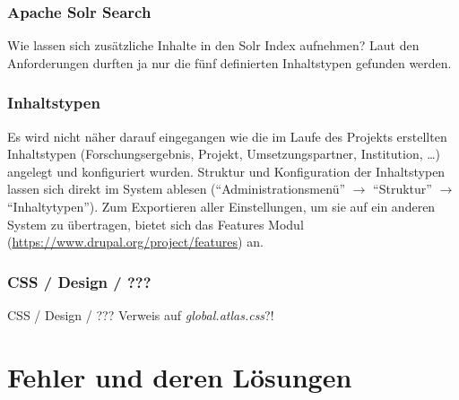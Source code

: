 \subsubsection{Apache Solr Search}\label{subsub:apachesolr}
Wie lassen sich zusätzliche Inhalte in den Solr Index aufnehmen? Laut den Anforderungen durften ja nur die fünf definierten Inhaltstypen gefunden werden. 

\subsubsection{Inhaltstypen}\label{subsub:inhaltstypen}
Es wird nicht näher darauf eingegangen wie die im Laufe des Projekts erstellten Inhaltstypen (Forschungsergebnis, Projekt, Umsetzungspartner, Institution, \dots) angelegt und konfiguriert wurden. Struktur und Konfiguration der Inhaltstypen lassen sich direkt im System ablesen (\enquote{Administrationsmenü} $\rightarrow$ \enquote{Struktur} $\rightarrow$  \enquote{Inhaltytypen}). Zum Exportieren aller Einstellungen, um sie auf ein anderen System zu übertragen, bietet sich \zB das Features Modul (\url{https://www.drupal.org/project/features}) an. 

\subsubsection{CSS / Design / ???}\label{subsub:cssdesign}
CSS / Design / ???
Verweis auf \textit{global.atlas.css}?!




\newpage
\section{Fehler und deren Lösungen}\label{sec:problems}

